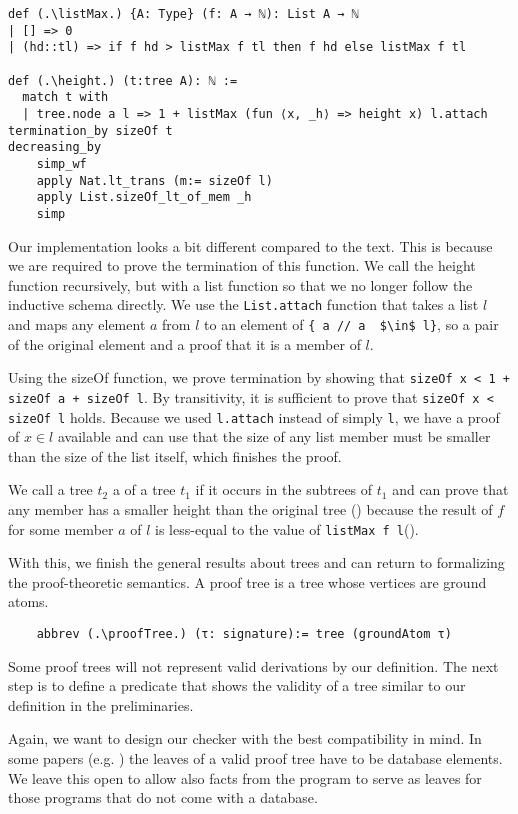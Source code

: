 \begin{lstlisting}
def (.\listMax.) {A: Type} (f: A → ℕ): List A → ℕ
| [] => 0
| (hd::tl) => if f hd > listMax f tl then f hd else listMax f tl

def (.\height.) (t:tree A): ℕ :=
  match t with
  | tree.node a l => 1 + listMax (fun ⟨x, _h⟩ => height x) l.attach
termination_by sizeOf t
decreasing_by
    simp_wf
    apply Nat.lt_trans (m:= sizeOf l)
    apply List.sizeOf_lt_of_mem _h
    simp
\end{lstlisting}

Our implementation looks a bit different compared to the text. This is because we are required to prove the termination of this function. We call the height function recursively, but with a list function so that we no longer follow the inductive schema directly. We use the \lstinline|List.attach| function that takes a list $l$ and maps any element $a$ from $l$ to an element of \lstinline|{ a // a  $\in$ l}|, so a pair of the original element and a proof that it is a member of $l$.

Using the sizeOf function, we prove termination by showing that \lstinline|sizeOf x < 1 + sizeOf a + sizeOf l|. By transitivity, it is sufficient to prove that \lstinline|sizeOf x < sizeOf l| holds. Because we used \lstinline|l.attach| instead of simply \lstinline|l|, we have a proof of $x \in l$ available and can use that the size of any list member must be smaller than the size of the list itself, which finishes the proof. 

We call a tree $t_2$ a \member of a tree $t_1$ if it occurs in the subtrees of $t_1$ and can prove that any member has a smaller height than the original tree (\heightOfMemberIsSmaller) because the result of $f$ for some member $a$ of $l$ is less-equal to the value of \lstinline|listMax f l|(\listMaxlefmember).

With this, we finish the general results about trees and can return to formalizing the proof-theoretic semantics. A proof tree is a tree whose vertices are ground atoms.

\begin{lstlisting}
    abbrev (.\proofTree.) (τ: signature):= tree (groundAtom τ)
\end{lstlisting}

Some proof trees will not represent valid derivations by our definition. The next step is to define a predicate that shows the validity of a tree similar to our definition in the preliminaries.

Again, we want to design our checker with the best compatibility in mind. In some papers (e.g. \cite{ComplexityProvDatalog}) the leaves of a valid proof tree have to be database elements. We leave this open to allow also facts from the program to serve as leaves for those programs that do not come with a database.

